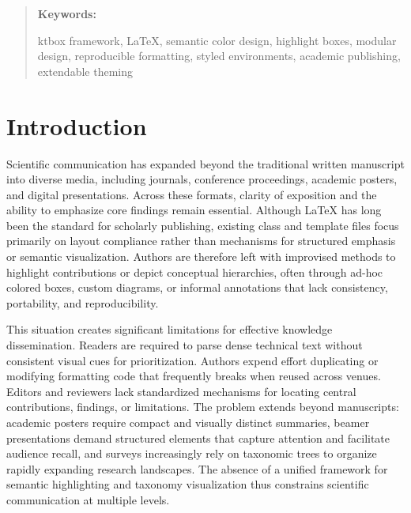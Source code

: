\documentclass[12pt,onecolumn]{article}
\newenvironment{keywords}{
  \begin{quote}\small\textbf{Keywords:}%
}{\end{quote}}
\begin{document}
  \begin{keywords}
ktbox framework, LaTeX, semantic color design, highlight boxes, modular design, reproducible formatting, styled environments, academic publishing, extendable theming


  \end{keywords}


  \section{Introduction}
  \label{sec:introduction}
Scientific communication has expanded beyond the traditional written manuscript into diverse media, including journals, conference proceedings, academic posters, and digital presentations. Across these formats, clarity of exposition and the ability to emphasize core findings remain essential. Although \LaTeX{} has long been the standard for scholarly publishing, existing class and template files focus primarily on layout compliance rather than mechanisms for structured emphasis or semantic visualization. Authors are therefore left with improvised methods to highlight contributions or depict conceptual hierarchies, often through ad-hoc colored boxes, custom diagrams, or informal annotations that lack consistency, portability, and reproducibility.

This situation creates significant limitations for effective knowledge dissemination. Readers are required to parse dense technical text without consistent visual cues for prioritization. Authors expend effort duplicating or modifying formatting code that frequently breaks when reused across venues. Editors and reviewers lack standardized mechanisms for locating central contributions, findings, or limitations. The problem extends beyond manuscripts: academic posters require compact and visually distinct summaries, beamer presentations demand structured elements that capture attention and facilitate audience recall, and surveys increasingly rely on taxonomic trees to organize rapidly expanding research landscapes. The absence of a unified framework for semantic highlighting and taxonomy visualization thus constrains scientific communication at multiple levels.
\end{document}
